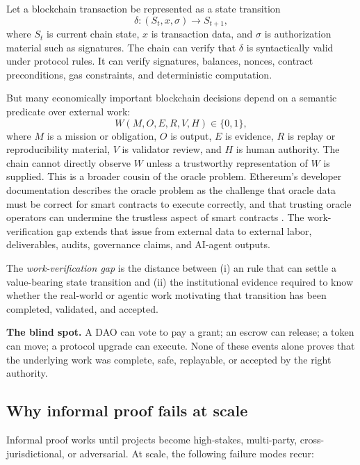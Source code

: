 Let a blockchain transaction be represented as a state transition
\[
  \delta: (S_t, x, \sigma) \rightarrow S_{t+1},
\]
where $S_t$ is current chain state, $x$ is transaction data, and $\sigma$ is authorization material such as signatures. The chain can verify that $\delta$ is syntactically valid under protocol rules. It can verify signatures, balances, nonces, contract preconditions, gas constraints, and deterministic computation.

But many economically important blockchain decisions depend on a semantic predicate over external work:
\[
  W(M, O, E, R, V, H) \in \{0,1\},
\]
where $M$ is a mission or obligation, $O$ is output, $E$ is evidence, $R$ is replay or reproducibility material, $V$ is validator review, and $H$ is human authority. The chain cannot directly observe $W$ unless a trustworthy representation of $W$ is supplied. This is a broader cousin of the oracle problem. Ethereum's developer documentation describes the oracle problem as the challenge that oracle data must be correct for smart contracts to execute correctly, and that trusting oracle operators can undermine the trustless aspect of smart contracts \citep{ethereumOracles}. The work-verification gap extends that issue from external data to external labor, deliverables, audits, governance claims, and AI-agent outputs.

\begin{definition}
The \emph{work-verification gap} is the distance between (i) an \onchain{} rule that can settle a value-bearing state transition and (ii) the \offchain{} institutional evidence required to know whether the real-world or agentic work motivating that transition has been completed, validated, and accepted.
\end{definition}

\begin{dangerbox}
\textbf{The blind spot.} A DAO can vote to pay a grant; an escrow can release; a token can move; a protocol upgrade can execute. None of these events alone proves that the underlying work was complete, safe, replayable, or accepted by the right authority.
\end{dangerbox}

\subsection{Why informal proof fails at scale}

Informal proof works until projects become high-stakes, multi-party, cross-jurisdictional, or adversarial. At scale, the following failure modes recur:

